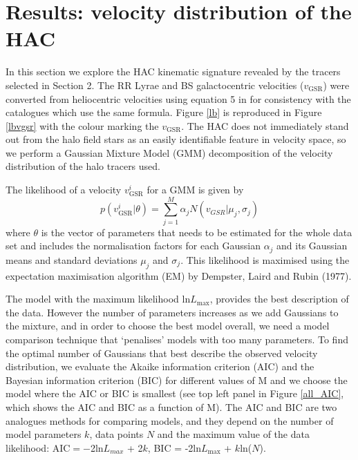 \documentclass[useAMS,usenatbib]{mn2e}
\begin{document}
%
\section{Results: velocity distribution of the HAC}

In this section we explore the HAC kinematic signature revealed by the tracers selected in Section 2. The RR Lyrae and BS galactocentric velocities ($v_{\mathrm{GSR}}$) were converted from heliocentric velocities using equation 5 in \citet{Xu08} for consistency with the \citet{Xu11, Xu14} catalogues which use the same formula. Figure \ref{lb} is reproduced in Figure \ref{lbvgsr} with the colour marking the $v_{\mathrm{GSR}}$. 
The HAC does not immediately stand out from the halo field stars as an easily identifiable feature in velocity space, so we perform a Gaussian Mixture Model (GMM) decomposition of the velocity distribution of the halo tracers used.

 The likelihood of a velocity $v_{\mathrm{GSR}}^{i}$ for a GMM is given by 
 \begin{equation}
 p(v_{\mathrm{GSR}}^{i}|\theta) = \sum_{j=1}^{M} \alpha_{j} N({v_{GSR}|\mu_{j}, \sigma_{j}})
 \end{equation}
where $\theta$ is the vector of parameters that needs to be estimated for the whole data set and includes the normalisation factors for each Gaussian $\alpha_{j}$ and its Gaussian means and standard deviations $\mu_{j}$ and $\sigma_{j}$. This  likelihood is maximised using the expectation maximisation algorithm (EM) by Dempster, Laird and Rubin (1977). %

The model with the maximum likelihood ln$L_{\mathrm{max}}$, provides the best description of the data. However the number of parameters increases as we add Gaussians to the mixture, and in order to choose the best model overall, we need a model comparison technique that ‘penalises’ models with too many parameters. To find the optimal number of Gaussians that best describe the observed velocity distribution, we evaluate the Akaike information criterion (AIC) and the Bayesian information criterion (BIC) for different values of M and we choose the model where the AIC or BIC is smallest (see top left panel in Figure \ref{all_AIC}, which shows the AIC and BIC as a function of M). The AIC and BIC are two analogues methods for comparing models, and they depend on the number of model parameters $k$, data points $N$ and the maximum value of the data likelihood: AIC$ = -$2ln$L_{max}$ + 2$k$, BIC = -2ln$L_{\mathrm{max}}$ + $k$ln($N$).
\end{document}
